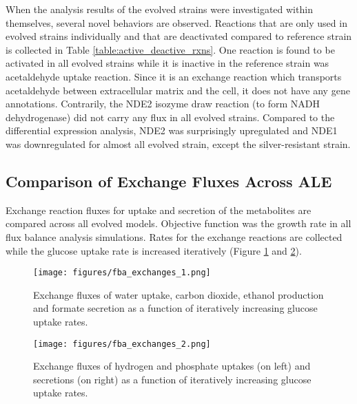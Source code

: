 When the analysis results of the evolved strains were investigated within themselves, several novel behaviors are observed. Reactions that are only used in evolved strains individually and that are deactivated compared to reference strain is collected in Table \ref{table:active_deactive_rxns}. One reaction is found to be activated in all evolved strains while it is inactive in the reference strain was acetaldehyde uptake reaction. Since it is an exchange reaction which transports acetaldehyde between extracellular matrix and the cell, it does not have any gene annotations. Contrarily, the NDE2 isozyme draw reaction (to form NADH dehydrogenase) did not carry any flux in all evolved strains. Compared to the differential expression analysis, NDE2 was surprisingly upregulated and NDE1 was downregulated for almost all evolved strain, except the silver-resistant strain.



\vspace{-1cm}

\subsection{Comparison of Exchange Fluxes Across ALE}

Exchange reaction fluxes for uptake and secretion of the metabolites are compared across all evolved models. Objective function was the growth rate in all flux balance analysis simulations. Rates for the exchange reactions are collected while the glucose uptake rate is increased iteratively (Figure \ref{fig:fba_exchanges_1} and \ref{fig:fba_exchanges_2}).

\begin{figure}[H]
  \begin{center}
  \texttt{[image: figures/fba\_exchanges\_1.png]}
  \caption[Exchange fluxes of water, carbon dioxide, ethanol and formate secretion as a function of iteratively increasing glucose uptake rates]{Exchange fluxes of water uptake, carbon dioxide, ethanol production and formate secretion as a function of iteratively increasing glucose uptake rates.}
  \label{fig:fba_exchanges_1}
  \end{center}
  \end{figure}

\vspace{-0.5cm}

\begin{figure}[H]
  \begin{center}
  \texttt{[image: figures/fba\_exchanges\_2.png]}
  \caption[Exchange fluxes of hydrogen and phosphate uptakes (on the left) and secretions (on the right) as a function of iteratively increasing glucose uptake rates]{Exchange fluxes of hydrogen and phosphate uptakes (on left) and secretions (on right) as a function of iteratively increasing glucose uptake rates.}
  \label{fig:fba_exchanges_2}
  \end{center}
  \end{figure}

